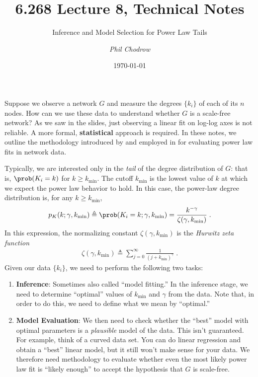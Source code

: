 \documentclass[english]{scrartcl}
\title{6.268 Lecture 8, Technical Notes}
\subtitle{Inference and Model Selection for Power Law Tails}
\author{\emph{Phil Chodrow}}
\date{\today}
\begin{document}

\maketitle

Suppose we observe a network $G$ and measure the degrees $\{k_i\}$ of each of its $n$ nodes. How can we use these data to understand whether $G$ is a scale-free network? As we saw in the slides, just observing a linear fit on log-log axes is not reliable. A more formal, \textbf{statistical} approach is required. In these notes, we outline the methodology introduced by \cite{Clauset2009} and employed in \cite{Broido2017} for evaluating power law fits in network data. 

Typically, we are interested only in the \emph{tail} of the degree distribution of $G$: that is, $\prob(K_i = k)$ for $k \geq k_{\text{min}}$. The cutoff $k_{\text{min}}$ is the lowest value of $k$ at which we expect the power law behavior to hold. In this case, the power-law degree distribution is, for any $k \geq k_{\text{min}}$,
\begin{align}
	p_K(k;\gamma, k_{\text{min}}) \triangleq \prob(K_i = k; \gamma, k_{\text{min}}) = \frac{k^{-\gamma}}{\zeta(\gamma, k_{\text{min}})} \label{eq:pdf}\;.
\end{align}
In this expression, the normalizing constant $\zeta(\gamma, k_{\text{min}})$ is the \emph{Hurwitz zeta function}
\begin{align}
	\zeta(\gamma, k_{\text{min}}) \triangleq \sum_{j = 0}^\infty  \frac{1}{(j + k_{\text{min}})^\gamma}\;.
\end{align}
Given our data $\{k_i\}$, we need to perform the following two tasks: 
\begin{enumerate}
	\item \textbf{Inference}: Sometimes also called ``model fitting.'' In the inference stage, we need to determine ``optimal'' values of $k_{\text{min}}$ and $\gamma$ from the data. Note that, in order to do this, we need to define what we mean by ``optimal.''
	\item \textbf{Model Evaluation}: We then need to check whether the ``best'' model with optimal parameters is a \emph{plausible} model of the data. This isn't guaranteed. For example, think of a curved data set. You can do linear regression and obtain a ``best'' linear model, but it still won't make sense for your data. We therefore need methodology to evaluate whether even the most likely power law fit is ``likely enough'' to accept the hypothesis that $G$ is scale-free.  
\end{enumerate}
\end{document}
